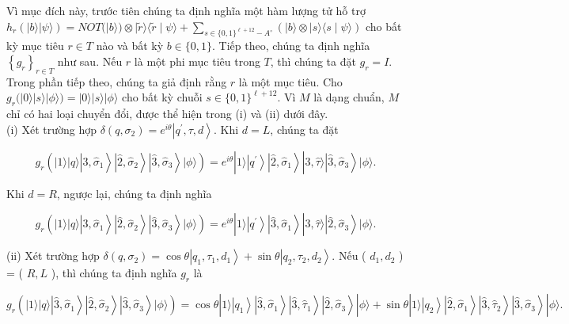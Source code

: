 \documentclass[10pt]{article}
\begin{document}
Vì mục đích này, trước tiên chúng ta định nghĩa một hàm lượng tử hỗ trợ $h_{r}(|b\rangle|\psi\rangle)=N O T(|b\rangle) \otimes|\tilde{r}\rangle\langle\tilde{r} \mid \psi\rangle+ \sum_{s \in\{0,1\}^{\ell+12}-A^{\circ}}(|b\rangle \otimes|s\rangle\langle s \mid \psi\rangle)$ cho bất kỳ mục tiêu $r \in T$ nào và bất kỳ $b \in\{0,1\}$. Tiếp theo, chúng ta định nghĩa $\left\{g_{r}\right\}_{r \in T}$ như sau. Nếu $r$ là một phi mục tiêu trong $T$, thì chúng ta đặt $g_{r}=I$. Trong phần tiếp theo, chúng ta giả định rằng $r$ là một mục tiêu. Cho $g_{r}(|0\rangle|s\rangle|\phi\rangle)=|0\rangle|s\rangle|\phi\rangle$ cho bất kỳ chuỗi $s \in\{0,1\}^{\ell+12}$. Vì $M$ là dạng chuẩn, $M$ chỉ có hai loại chuyển đổi, được thể hiện trong (i) và (ii) dưới đây.\\
(i) Xét trường hợp $\delta\left(q, \sigma_{2}\right)=e^{i \theta}\left|q^{\prime}, \tau, d\right\rangle$. Khi $d=L$, chúng ta đặt

$$
g_{r}\left(|1\rangle|q\rangle\left|\hat{3}, \hat{\sigma}_{1}\right\rangle\left|\hat{2}, \hat{\sigma}_{2}\right\rangle\left|\hat{3}, \hat{\sigma}_{3}\right\rangle|\phi\rangle\right)=e^{i \theta}|1\rangle\left|q^{\prime}\right\rangle\left|\hat{2}, \hat{\sigma}_{1}\right\rangle|\hat{3}, \hat{\tau}\rangle\left|\hat{3}, \hat{\sigma}_{3}\right\rangle|\phi\rangle .
$$

Khi $d=R$, ngược lại, chúng ta định nghĩa

$$
g_{r}\left(|1\rangle|q\rangle\left|\hat{3}, \hat{\sigma}_{1}\right\rangle\left|\hat{2}, \hat{\sigma}_{2}\right\rangle\left|\hat{3}, \hat{\sigma}_{3}\right\rangle|\phi\rangle\right)=e^{i \theta}|1\rangle\left|q^{\prime}\right\rangle\left|\hat{3}, \hat{\sigma}_{1}\right\rangle|\hat{3}, \hat{\tau}\rangle\left|\hat{2}, \hat{\sigma}_{3}\right\rangle|\phi\rangle .
$$

(ii) Xét trường hợp $\delta\left(q, \sigma_{2}\right)=\cos \theta\left|q_{1}, \tau_{1}, d_{1}\right\rangle+\sin \theta\left|q_{2}, \tau_{2}, d_{2}\right\rangle$. Nếu ( $d_{1}, d_{2}$ ) = ( $R, L$ ), thì chúng ta định nghĩa $g_{r}$ là

$$
g_{r}\left(|1\rangle|q\rangle\left|\hat{3}, \hat{\sigma}_{1}\right\rangle\left|\hat{2}, \hat{\sigma}_{2}\right\rangle\left|\hat{3}, \hat{\sigma}_{3}\right\rangle|\phi\rangle\right)=\cos \theta|1\rangle\left|q_{1}\right\rangle\left|\hat{3}, \hat{\sigma}_{1}\right\rangle\left|\hat{3}, \hat{\tau}_{1}\right\rangle\left|\hat{2}, \hat{\sigma}_{3}\right\rangle|\phi\rangle+\sin \theta|1\rangle\left|q_{2}\right\rangle\left|\hat{2}, \hat{\sigma}_{1}\right\rangle\left|\hat{3}, \hat{\tau}_{2}\right\rangle\left|\hat{3}, \hat{\sigma}_{3}\right\rangle|\phi\rangle .
$$
\end{document}
